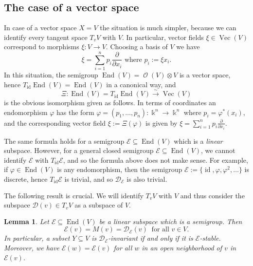 \documentclass{amsart}
\newtheorem{lem}[thm]{Lemma}
\theoremstyle{definition}
\theoremstyle{remark}
\begin{document}
{\par\smallskip}
\subsection{The case of a vector space}
In case of a vector space $X = V$ the situation is much simpler, because we can identify every tangent space $T_{v}V$ with $V$. In particular,  vector fields $\xi\in\operatorname{Vec}(V)$ correspond to morphisms $\xi\colon V\to V$. Choosing a basis of $V$ we have
$$
\xi = \sum_{i=1}^{n}p_{i}{\frac{\partial}{\partial x_{i}}} \text{ where }p_{i} := \xi x_{i}.
$$
In this situation, the semigroup $\operatorname{End}(V) = \operatorname{\mathcal O}(V) \otimes V$ is a vector space, hence $T_\operatorname{id}\operatorname{End}(V) = \operatorname{End}(V)$ in a canonical way, and 
$$
\Xi\colon \operatorname{End}(V) = T_\operatorname{id}\operatorname{End}(V) {\xrightarrow{\sim}} \operatorname{Vec}(V)
$$ 
is the obvious isomorphism given as follows. In terms of coordinates an endomorphism ${\varphi}$ has the form ${\varphi}=(p_{1},\ldots,p_{n})\colon {\Bbbk}^{n} \to {\Bbbk}^{n}$ where $p_{i}={\varphi}^{*}(x_{i})$, and the corresponding vector field $\xi:=\Xi({\varphi})$ is given by  $\xi= \sum_{i=1}^{n}p_{i}{\frac{\partial}{\partial x_{i}}}$. 

The same formula holds for a semigroup  ${\mathcal E} {\subseteq} \operatorname{End}(V)$ which is a  {\it linear} subspace.
However, for a general closed semigroup ${\mathcal E}{\subseteq}\operatorname{End}(V)$, we cannot identify ${\mathcal E}$ with $T_\operatorname{id}{\mathcal E}$, and so the formula above does not make sense. For example, if ${\varphi}\in\operatorname{End}(V)$ is any endomorphism, then the semigroup ${\mathcal E}:=\{\operatorname{id},{\varphi},{\varphi}^{2},\ldots\}$ is discrete, hence $T_\operatorname{id}{\mathcal E}$ is trivial, and so ${\mathcal D}_{\mathcal E}$ is also trivial.
\par\smallskip
The following result is crucial. We will identify $T_{v}V$ with $V$ and thus consider the subspace ${\mathcal D}(v) \in T_{v}V$ as a subspace of $V$. 

\begin{lem}\label{main-lemma}
Let ${\mathcal E} {\subseteq} \operatorname{End}(V)$ be a linear subspace which is a semigroup. Then 
$$
{\mathcal E}(v) = M(v) = {\mathcal D}_{\mathcal E}(v) \ \text{ for all } v \in V.
$$
In particular, a subset $Y {\subseteq} V$ is ${\mathcal D}_{\mathcal E}$-invariant if and only if it is ${\mathcal E}$-stable.
Moreover, we have ${\mathcal E}(w) = {\mathcal E}(v)$ for all $w$ in an open neighborhood of $v$ in ${\mathcal E}(v)$.
\end{lem}
\end{document}

